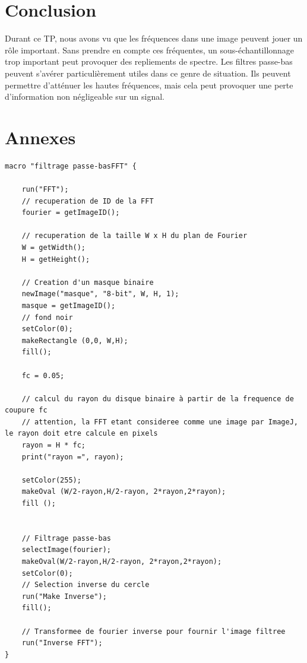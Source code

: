 \documentclass[a4paper,11pt]{article}
\begin{document}
  \section*{Conclusion}
  Durant ce TP, nous avons vu que les fréquences dans une image peuvent jouer un rôle important. 
  Sans prendre en compte ces fréquentes, un sous-échantillonnage trop important peut 
  provoquer des repliements de spectre. Les filtres passe-bas peuvent s'avérer
  particulièrement utiles dans ce genre de situation. Ils peuvent permettre d'atténuer 
  les hautes fréquences, mais cela peut provoquer une perte d'information non 
  négligeable sur un signal.\\

  
  \newpage
  \section{Annexes}
  \begin{lstlisting}[caption=Macro d'atténuation du phénomène de moiré]
macro "filtrage passe-basFFT" {

    run("FFT");
    // recuperation de ID de la FFT
    fourier = getImageID();

    // recuperation de la taille W x H du plan de Fourier
    W = getWidth();
    H = getHeight();

    // Creation d'un masque binaire
    newImage("masque", "8-bit", W, H, 1);
    masque = getImageID();
    // fond noir
    setColor(0);
    makeRectangle (0,0, W,H);
    fill();

    fc = 0.05;

    // calcul du rayon du disque binaire à partir de la frequence de coupure fc
    // attention, la FFT etant consideree comme une image par ImageJ, le rayon doit etre calcule en pixels
    rayon = H * fc;
    print("rayon =", rayon);

    setColor(255);
    makeOval (W/2-rayon,H/2-rayon, 2*rayon,2*rayon);
    fill ();


    // Filtrage passe-bas
    selectImage(fourier);
    makeOval(W/2-rayon,H/2-rayon, 2*rayon,2*rayon);
    setColor(0);
    // Selection inverse du cercle
    run("Make Inverse");
    fill();

    // Transformee de fourier inverse pour fournir l'image filtree
    run("Inverse FFT");
}
  \end{lstlisting}
\end{document}
